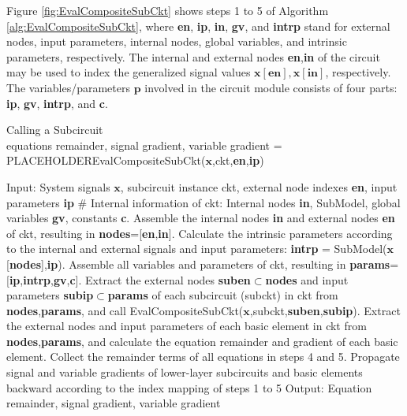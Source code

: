 Figure \ref{fig:EvalCompositeSubCkt} shows steps 1 to 5 of Algorithm \ref{alg:EvalCompositeSubCkt}, where \textbf{en}, \textbf{ip}, \textbf{in}, \textbf{gv}, and \textbf{intrp} stand for external nodes, input parameters, internal nodes, global variables, and intrinsic parameters, respectively. The internal and external nodes \textbf{en},\textbf{in} of the circuit may be used to index the generalized signal values $\bm{x}[\textbf{en}],\bm{x}[\textbf{in}]$, respectively. The variables/parameters $\bm{p}$ involved in the circuit module consists of four parts: \textbf{ip}, \textbf{gv}, \textbf{intrp}, and \textbf{c}.

\begin{algorithm}[h]
\caption{Calling a Subcircuit\\
    equations remainder, signal gradient, variable gradient = \\
    {\color{white}\tiny PLACEHOLDER}EvalCompositeSubCkt($\bm{x}$,ckt,\textbf{en},\textbf{ip})
    }
\label{alg:EvalCompositeSubCkt}
\SetAlgoLined
Input: System signals $\bm{x}$, subcircuit instance ckt,
  external node indexes \textbf{en}, input parameters \textbf{ip}\;
\# Internal information of ckt: Internal nodes \textbf{in}, SubModel, global variables \textbf{gv}, constants \textbf{c}. Assemble the internal nodes \textbf{in} and external nodes \textbf{en} of ckt, resulting in \textbf{nodes}=[\textbf{en},\textbf{in}]. Calculate the intrinsic parameters according to the internal and external signals and input parameters: \textbf{intrp} = SubModel($\bm{x}$[\textbf{nodes}],\textbf{ip}). Assemble all variables and parameters of ckt, resulting in \textbf{params}= [\textbf{ip},\textbf{intrp},\textbf{gv},\textbf{c}]. Extract the external nodes \textbf{suben}$\subset$\textbf{nodes} and input parameters \textbf{subip}$\subset$\textbf{params} of each subcircuit (subckt) in ckt from \textbf{nodes},\textbf{params}, and call EvalCompositeSubCkt($\bm{x}$,subckt,\textbf{suben},\textbf{subip}). Extract the external nodes and input parameters of each basic element in ckt from \textbf{nodes},\textbf{params}, and calculate the equation remainder and gradient of each basic element. Collect the remainder terms of all equations in steps 4 and 5. Propagate signal and variable gradients of lower-layer subcircuits and basic elements backward according to the index mapping of steps 1 to 5\;
Output: Equation remainder, signal gradient, variable gradient
\end{algorithm}
